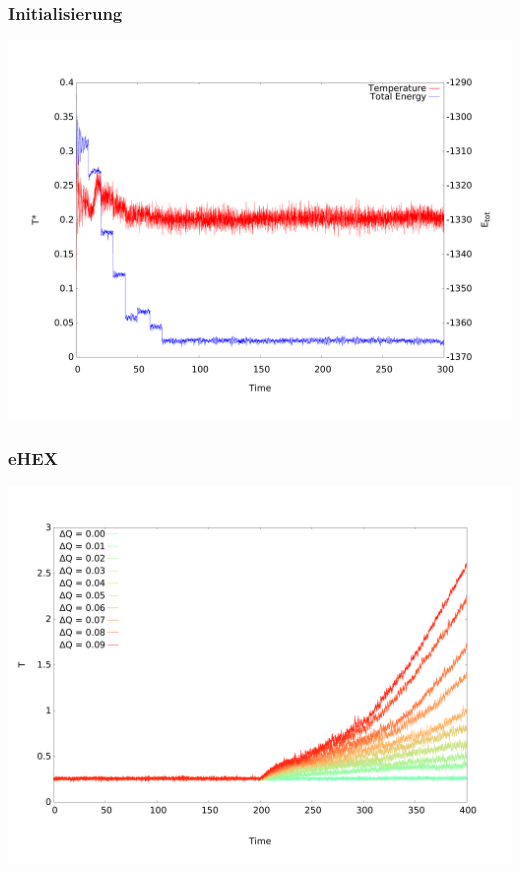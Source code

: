 \documentclass[handout]{beamer}
\begin{document}
\begin{frame}
\frametitle{Initialisierung}
\begin{center}
\includegraphics[scale=0.3]{../images/verlet_output_te.pdf}
\end{center}
\end{frame}

\begin{frame}
\frametitle{eHEX}
\begin{center}
\includegraphics[scale=0.3]{../images/ehex_temp_dq.pdf}
\end{center}
\end{frame}
\end{document}
